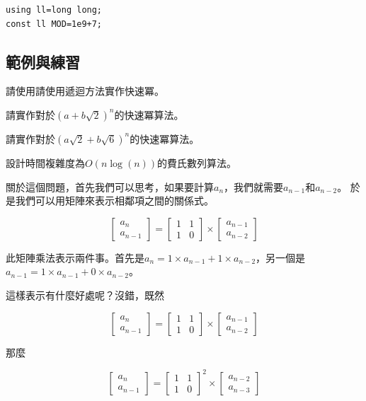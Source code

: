 \begin{lstlisting}
using ll=long long;
const ll MOD=1e9+7;
\end{lstlisting}

    \subsection{範例與練習}
    \problem 請使用請使用遞迴方法實作快速冪。

    \problem 請實作對於$(a+b\sqrt{2})^{n}$的快速冪算法。

    \problem 請實作對於$(a\sqrt{2}+b\sqrt{6})^{n}$的快速冪算法。

    \example 設計時間複雜度為$O(n\log{(n)})$的費氏數列算法。

    關於這個問題，首先我們可以思考，如果要計算$a_n$，我們就需要$a_{n-1}$和$a_{n-2}$。
    於是我們可以用矩陣來表示相鄰項之間的關係式。

    $$\begin{bmatrix}
        a_n \\
        a_{n-1}
    \end{bmatrix}
    =
    \begin{bmatrix}
        1 & 1 \\
        1 & 0
    \end{bmatrix}
    \times 
    \begin{bmatrix}
        a_{n-1} \\
        a_{n-2}
    \end{bmatrix}$$

    此矩陣乘法表示兩件事。首先是$a_n=1 \times a_{n-1}+1 \times a_{n-2}$，另一個是$a_{n-1}=1 \times a_{n-1}+0 \times a_{n-2}$。

    這樣表示有什麼好處呢？沒錯，既然

    $$\begin{bmatrix}
        a_n \\
        a_{n-1}
    \end{bmatrix}
    =
    \begin{bmatrix}
        1 & 1 \\
        1 & 0
    \end{bmatrix}
    \times 
    \begin{bmatrix}
        a_{n-1} \\
        a_{n-2}
    \end{bmatrix}$$

    那麼 

    $$\begin{bmatrix}
        a_n \\
        a_{n-1}
    \end{bmatrix}
    =
    \begin{bmatrix}
        1 & 1 \\
        1 & 0
    \end{bmatrix}^{2}
    \times 
    \begin{bmatrix}
        a_{n-2} \\
        a_{n-3}
    \end{bmatrix}$$

